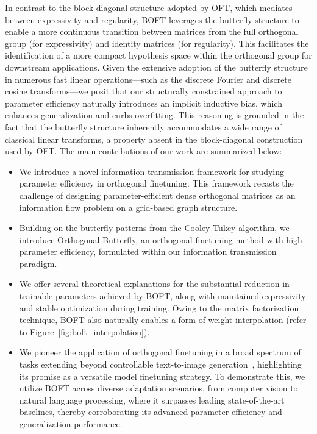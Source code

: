 In contrast to the block-diagonal structure adopted by OFT, which mediates between expressivity and regularity, BOFT leverages the butterfly structure to enable a more continuous transition between matrices from the full orthogonal group (for expressivity) and identity matrices (for regularity). This facilitates the identification of a more compact hypothesis space within the orthogonal group for downstream applications. Given the extensive adoption of the butterfly structure in numerous fast linear operations—such as the discrete Fourier and discrete cosine transforms—we posit that our structurally constrained approach to parameter efficiency naturally introduces an implicit inductive bias, which enhances generalization and curbs overfitting. This reasoning is grounded in the fact that the butterfly structure inherently accommodates a wide range of classical linear transforms, a property absent in the block-diagonal construction used by OFT. The main contributions of our work are summarized below:

\begin{itemize}[leftmargin=*,nosep]
    \item We introduce a novel information transmission framework for studying parameter efficiency in orthogonal finetuning. This framework recasts the challenge of designing parameter-efficient dense orthogonal matrices as an information flow problem on a grid-based graph structure.
    \item Building on the butterfly patterns from the Cooley-Tukey algorithm, we introduce Orthogonal Butterfly, an orthogonal finetuning method with high parameter efficiency, formulated within our information transmission paradigm.
    \item We offer several theoretical explanations for the substantial reduction in trainable parameters achieved by BOFT, along with maintained expressivity and stable optimization during training. Owing to the matrix factorization technique, BOFT also naturally enables a form of weight interpolation (refer to Figure~\ref{fig:boft_interpolation}).
    \item We pioneer the application of orthogonal finetuning in a broad spectrum of tasks extending beyond controllable text-to-image generation~\cite{qiu2023controlling}, highlighting its promise as a versatile model finetuning strategy. To demonstrate this, we utilize BOFT across diverse adaptation scenarios, from computer vision to natural language processing, where it surpasses leading state-of-the-art baselines, thereby corroborating its advanced parameter efficiency and generalization performance.
\end{itemize}

